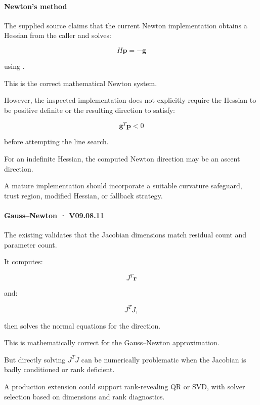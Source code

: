 \paragraph{Newton's method}\label{02-foundations-ii-ch028-newtons-method}

\hypertarget{02-foundations-ii-ch028-newtons-method}{}

The supplied source claims that the current Newton implementation obtains a Hessian from the caller and solves:

\[
H\mathbf p=-\mathbf g
\]

using .

This is the correct mathematical Newton system.

However, the inspected implementation does not explicitly require the Hessian to be positive definite or the resulting direction to satisfy:

\[
\mathbf g^T\mathbf p<0
\]

before attempting the line search.

For an indefinite Hessian, the computed Newton direction may be an ascent direction.

A mature implementation should incorporate a suitable curvature safeguard, trust region, modified Hessian, or fallback strategy.

\paragraph{Gauss--Newton · V09.08.11}\label{02-foundations-ii-ch028-gaussnewton-v09.08.11}

\hypertarget{02-foundations-ii-ch028-gaussnewton-v09.08.11}{}

The existing  validates that the Jacobian dimensions match residual count and parameter count.

It computes:

\[
J^T\mathbf r
\]

and:

\[
J^TJ,
\]

then solves the normal equations for the direction.

This is mathematically correct for the Gauss--Newton approximation.

But directly solving \(J^TJ\) can be numerically problematic when the Jacobian is badly conditioned or rank deficient.

A production extension could support rank-revealing QR or SVD, with solver selection based on dimensions and rank diagnostics.

